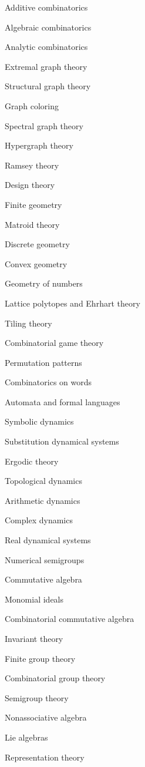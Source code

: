 \item Additive combinatorics
\item Algebraic combinatorics
\item Analytic combinatorics
\item Extremal graph theory
\item Structural graph theory
\item Graph coloring
\item Spectral graph theory
\item Hypergraph theory
\item Ramsey theory
\item Design theory
\item Finite geometry
\item Matroid theory
\item Discrete geometry
\item Convex geometry
\item Geometry of numbers
\item Lattice polytopes and Ehrhart theory
\item Tiling theory
\item Combinatorial game theory
\item Permutation patterns
\item Combinatorics on words
\item Automata and formal languages
\item Symbolic dynamics
\item Substitution dynamical systems
\item Ergodic theory
\item Topological dynamics
\item Arithmetic dynamics
\item Complex dynamics
\item Real dynamical systems
\item Numerical semigroups
\item Commutative algebra
\item Monomial ideals
\item Combinatorial commutative algebra
\item Invariant theory
\item Finite group theory
\item Combinatorial group theory
\item Semigroup theory
\item Nonassociative algebra
\item Lie algebras
\item Representation theory
